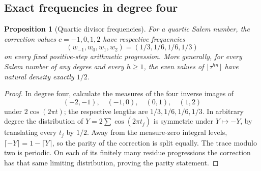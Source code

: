 \documentclass[11pt,a4paper]{article}
\newtheorem{proposition}[theorem]{Proposition}
\theoremstyle{definition}
\theoremstyle{remark}
\numberwithin{equation}{section}
\begin{document}
\subsection{Exact frequencies in degree four}

\begin{proposition}[Quartic divisor frequencies]\label{tw:prop:quartic-frequencies}
For a quartic Salem number, the correction values $c=-1,0,1,2$ have
respective frequencies
\[
 (w_{-1},w_0,w_1,w_2)=(1/3,1/6,1/6,1/3)
\]
on every fixed positive-step arithmetic progression.  More generally,
for every Salem number of any degree and every $h\ge1$, the even values
of $\lfloor\tau^{hn}\rfloor$ have natural density exactly $1/2$.
\end{proposition}
\begin{proof}
In degree four, calculate the measures of the four inverse images of
\[(-2,-1),\quad(-1,0),\quad(0,1),\quad(1,2)\] under $2\cos(2\pi t)$; the respective
lengths are $1/3,1/6,1/6,1/3$.  In arbitrary degree the distribution of
$Y=2\sum\cos(2\pi t_j)$ is symmetric under $Y\mapsto-Y$, by translating
every $t_j$ by $1/2$.  Away from the measure-zero integral levels,
$\lceil-Y\rceil=1-\lceil Y\rceil$, so the parity of the correction
is split equally.  The trace modulo two is periodic.  On each of its
finitely many residue progressions the correction has that same limiting
distribution, proving the parity statement.
\end{proof}
\end{document}
